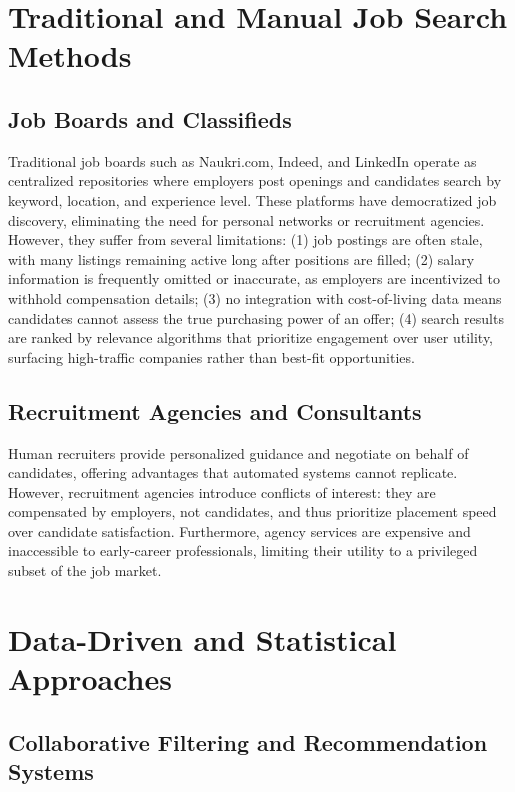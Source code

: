 \documentclass[12pt,a4paper,oneside]{report}
\begin{document}
\section{Traditional and Manual Job Search Methods}

\subsection{Job Boards and Classifieds}

Traditional job boards such as Naukri.com, Indeed, and LinkedIn operate as centralized repositories where employers post openings and candidates search by keyword, location, and experience level. These platforms have democratized job discovery, eliminating the need for personal networks or recruitment agencies. However, they suffer from several limitations: (1) job postings are often stale, with many listings remaining active long after positions are filled; (2) salary information is frequently omitted or inaccurate, as employers are incentivized to withhold compensation details; (3) no integration with cost-of-living data means candidates cannot assess the true purchasing power of an offer; (4) search results are ranked by relevance algorithms that prioritize engagement over user utility, surfacing high-traffic companies rather than best-fit opportunities.

\subsection{Recruitment Agencies and Consultants}

Human recruiters provide personalized guidance and negotiate on behalf of candidates, offering advantages that automated systems cannot replicate. However, recruitment agencies introduce conflicts of interest: they are compensated by employers, not candidates, and thus prioritize placement speed over candidate satisfaction. Furthermore, agency services are expensive and inaccessible to early-career professionals, limiting their utility to a privileged subset of the job market.

\section{Data-Driven and Statistical Approaches}

\subsection{Collaborative Filtering and Recommendation Systems}
\end{document}
